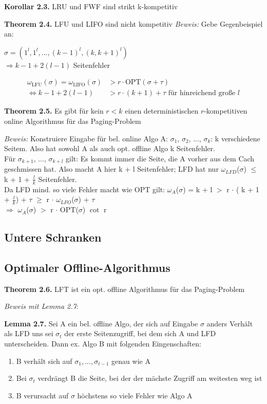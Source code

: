 \textbf{Korollar 2.3.} LRU und FWF sind strikt k-kompetitiv



\textbf{Theorem 2.4.} LFU und LIFO sind nicht kompetitiv
\textit{Beweis:} Gebe Gegenbeispiel an:

$\sigma = \left(1^l, 1^l, ..., (k-1)^l, (k, k+1)^l\right)$\\
$\Rightarrow k - 1 + 2(l - 1)$ Seitenfehler

\begin{align*}
\omega_{\textrm{LFU}}(\sigma) = \omega_{\textrm{LIFO}}(\sigma) &> r \cdot \textrm{OPT}(\sigma + \tau)\\
\Leftrightarrow k - 1 + 2 (l - 1) &> r \cdot (k + 1) + \tau \textrm{ für hinreichend große } l
\end{align*}



\textbf{Theorem 2.5.} Es gibt für kein $r < k$ einen deterministischen $r$-kompetitiven online Algorithmus für das Paging-Problem

\textit{Beweis:} Konstruiere Eingabe für bel. online Algo A: $\sigma_{1}$, $\sigma_{2}$, ..., $\sigma_{k}$: k verschiedene Seitem. Also hat sowohl A als auch opt. offline Algo k Seitenfehler.\\
Für $\sigma_{k + 1}$, ..., $\sigma_{k + l}$ gilt: Es kommt immer die Seite, die A vorher aus dem Cach geschmissen hat. Also macht A hier k + l Seitenfehler; LFD hat nur $\omega_{LFD}$($\sigma$) $\le$ k + 1 + $\tfrac{l}{k}$ Seitenfehler. \\
Da LFD mind. so viele Fehler macht wie OPT gilt: $\omega_{A}$($\sigma$) = k + l $>$ r $\cdot$ ( k + 1 + $\tfrac{l}{k}$) + $\tau$ $\ge$ r $\cdot$ $\omega_{LFO}$($\sigma$) + $\tau$ \\
 $\Rightarrow$  $\omega_{A}$($\sigma$) $>$ r $\cdot$ OPT($\sigma$) $\cot$ r


\subsection{Untere Schranken}


\subsection{Optimaler Offline-Algorithmus}

\textbf{Theorem 2.6.} LFT ist ein opt. offline Algorithmus für das Paging-Problem

\textit{Beweis mit Lemma 2.7}:

\textbf{Lemma 2.7.} Sei A ein bel. offline Algo, der sich auf Eingabe $\sigma$ anders Verhält als LFD uns sei $\sigma_{t}$ der erste Seitenzugriff, bei dem sich A und LFD unterscheiden. Dann ex. Algo B mit folgenden Eingenschaften:
\begin{enumerate}
\item B verhält sich auf $\sigma_{1}, ..., \sigma_{t - 1}$ genau wie A
\item Bei $\sigma_{t}$ verdrängt B die Seite, bei der der mächste Zugriff am weitesten weg ist
\item B verursacht auf $\sigma$ höchstens so viele Fehler wie Algo A
\end{enumerate}

